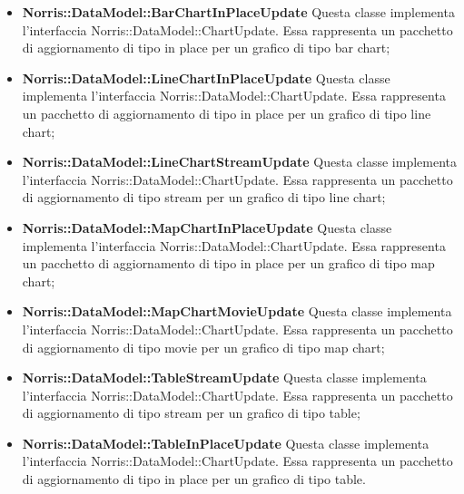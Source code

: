 \begin{itemize}
		\item \textbf{Norris::DataModel::BarChartInPlaceUpdate} Questa classe implementa l'interfaccia Norris::DataModel::ChartUpdate. Essa rappresenta un pacchetto di aggiornamento di tipo in place per un grafico di tipo bar chart;

		\item \textbf{Norris::DataModel::LineChartInPlaceUpdate} Questa classe implementa l'interfaccia Norris::DataModel::ChartUpdate. Essa rappresenta un pacchetto di aggiornamento di tipo in place per un grafico di tipo line chart;

		\item \textbf{Norris::DataModel::LineChartStreamUpdate} Questa classe implementa l'interfaccia Norris::DataModel::ChartUpdate. Essa rappresenta un pacchetto di aggiornamento di tipo stream per un grafico di tipo line chart;

		\item \textbf{Norris::DataModel::MapChartInPlaceUpdate} Questa classe implementa l'interfaccia Norris::DataModel::ChartUpdate. Essa rappresenta un pacchetto di aggiornamento di tipo in place per un grafico di tipo map chart;

		\item \textbf{Norris::DataModel::MapChartMovieUpdate} Questa classe implementa l'interfaccia Norris::DataModel::ChartUpdate. Essa rappresenta un pacchetto di aggiornamento di tipo movie per un grafico di tipo map chart;

		\item \textbf{Norris::DataModel::TableStreamUpdate} Questa classe implementa l'interfaccia Norris::DataModel::ChartUpdate. Essa rappresenta un pacchetto di aggiornamento di tipo stream per un grafico di tipo table;

		\item \textbf{Norris::DataModel::TableInPlaceUpdate} Questa classe implementa l'interfaccia Norris::DataModel::ChartUpdate. Essa rappresenta un pacchetto di aggiornamento di tipo in place per un grafico di tipo table.
	\end{itemize}
